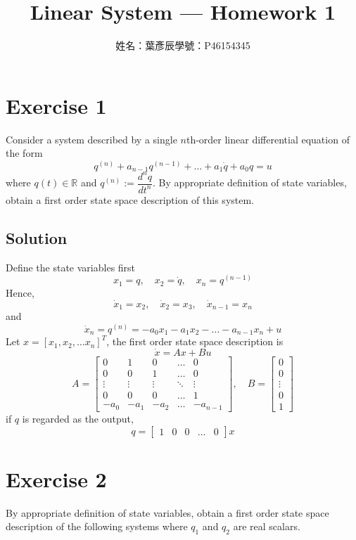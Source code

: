 \documentclass[12pt,a4paper]{article}
\title{Linear System --- Homework 1}
\author{姓名：葉彥辰\quad 學號：P46154345}
\date{}
\begin{document}
\maketitle

\section*{Exercise 1}
Consider a system described by a single $n$th-order linear differential equation of
the form
\[
q^{(n)} + a_{n-1}q^{(n -1)} + \dots + a_1\dot q + a_0q = u
\]
where $q(t)\in\mathbb{R}$ and $q^{(n)}:=\dfrac{d^nq}{dt^n}$.
By appropriate definition of state variables, obtain a first order state space
description of this system.

\subsection*{Solution}

Define the state variables first
\begin{equation*}
	x_1 = q,\quad x_2 = \dot q, \quad x_n = q^{(n - 1)}
\end{equation*}
Hence, 
\[
	\dot x_1 = x_2, \quad \dot x_2 = x_3, \quad \dot x_{n - 1} = x_n
\]
and
\[
	\dot x_n = q^{(n)} = -a_0x_1 -a_1x_2 - \dots -a_{n-1}x_n + u
\]
Let $ x = [x_1, x_2, \dots x_n]^T $, the first order state space description is
\[
	\dot x = Ax + Bu
\]
\[
	A = \begin{bmatrix}
		0 & 1 & 0 & \dots & 0 \\
		0 & 0 & 1 & \dots & 0 \\
		\vdots & \vdots & \vdots &  \ddots & \vdots \\
		0 & 0 & 0 & \dots & 1 \\
		-a_0 & -a_1 & -a_2 & \dots & -a_{n -1 }
	\end{bmatrix}, \quad B = \begin{bmatrix}
	0 \\ 0 \\ \vdots \\0 \\1
	\end{bmatrix}
\]
if $q$ is regarded as the output, 
\[
q = \begin{bmatrix}
	1 & 0 & 0 & \dots & 0
\end{bmatrix}x
\]

\section*{Exercise 2}
By appropriate definition of state variables, obtain a first order state space
description of the following systems where $q_1$ and $q_2$ are real scalars.
\end{document}
